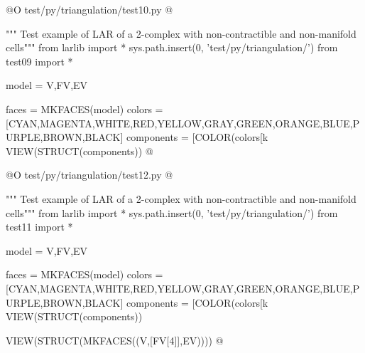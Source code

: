 \documentclass[11pt,oneside]{article}    %
\begin{document}
@O test/py/triangulation/test10.py
@{""" Test example of LAR of a 2-complex with non-contractible and non-manifold cells"""
from larlib import *
sys.path.insert(0, 'test/py/triangulation/')
from test09 import *

model = V,FV,EV

faces = MKFACES(model)
colors = [CYAN,MAGENTA,WHITE,RED,YELLOW,GRAY,GREEN,ORANGE,BLUE,PURPLE,BROWN,BLACK]
components = [COLOR(colors[k%
VIEW(STRUCT(components))
@}
@O test/py/triangulation/test12.py
@{""" Test example of LAR of a 2-complex with non-contractible and non-manifold cells"""
from larlib import *
sys.path.insert(0, 'test/py/triangulation/')
from test11 import *

model = V,FV,EV

faces = MKFACES(model)
colors = [CYAN,MAGENTA,WHITE,RED,YELLOW,GRAY,GREEN,ORANGE,BLUE,PURPLE,BROWN,BLACK]
components = [COLOR(colors[k%
VIEW(STRUCT(components))

VIEW(STRUCT(MKFACES((V,[FV[4]],EV))))
@}
\end{document}
